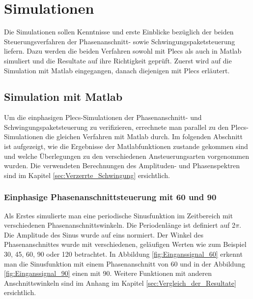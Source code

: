 \section{Simulationen}

Die Simulationen sollen Kenntnisse und erste Einblicke bezüglich der beiden Steuerungsverfahren der Phasenanschnitt- sowie Schwingungspaketsteuerung liefern. Dazu werden die beiden Verfahren sowohl mit Plecs als auch in Matlab simuliert und die Resultate auf ihre Richtigkeit geprüft. Zuerst wird auf die Simulation mit Matlab eingegangen, danach diejenigen mit Plecs erläutert.

\subsection{Simulation mit Matlab}\label{sec:Simulation_mit_Matlab}
Um die einphasigen Plecs-Simulationen der Phasenanschnitt- und Schwingungspaketsteuerung zu verifizieren, errechnete man parallel zu den Plecs-Simulationen die gleichen Verfahren mit Matlab durch. Im folgenden Abschnitt ist aufgezeigt, wie die Ergebnisse der Matlabfunktionen zustande gekommen sind und welche Überlegungen zu den verschiedenen Ansteuerungsarten vorgenommen wurden. Die verwendeten Berechnungen des Amplituden- und Phasenspektren sind im Kapitel \ref{sec:Verzerrte_Schwingung} ersichtlich.

\subsubsection{Einphasige Phasenanschnittsteuerung mit 60\textdegree\hspace{0.02cm} und 90\textdegree}
Als Erstes simulierte man eine periodische Sinusfunktion im Zeitbereich mit verschiedenen Phasenanschnittswinkeln. Die Periodenlänge ist definiert auf 2$\pi$. Die Amplitude des Sinus wurde auf eins normiert. Der Winkel des Phasenanschnittes wurde mit verschiedenen, geläufigen Werten wie zum Beispiel 30\textdegree, 45\textdegree \hspace{0.02cm}, 60\textdegree \hspace{0.02cm}, 90\textdegree \hspace{0.02cm} oder 120\textdegree \hspace{0.02cm} betrachtet. In Abbildung \ref{fig:Einganssignal_60} erkennt man die Sinusfunktion mit einem Phasenanschnitt von 60\textdegree \hspace{0.02cm} und in der Abbildung \ref{fig:Einganssignal_90} einen mit 90\textdegree \hspace{0.02cm}. Weitere Funktionen mit anderen Anschnittswinkeln sind im Anhang im Kapitel \ref{sec:Vergleich_der_Resultate} ersichtlich.

